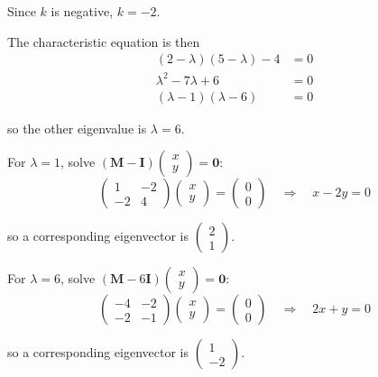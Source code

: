 \documentclass[leqno]{article}
\begin{document}
\begin{enumerate}[
  label=\textbf{\arabic*.},
  leftmargin=*,
  topsep=0pt,
  partopsep=0pt,
  parsep=0pt
]
\begin{djsSolution}
\begin{enumerate}[label=\textbf{(\alph*)}, start=1]
Since \(k\) is negative, \(k=-2\).

The characteristic equation is then
\begin{align*}
(2-\lambda)(5-\lambda)-4&=0\\
\lambda^2-7\lambda+6&=0\\
(\lambda-1)(\lambda-6)&=0
\end{align*}

so the other eigenvalue is \(\lambda=6\).

For \(\lambda=1\), solve \((\mathbf{M}-\mathbf{I})\begin{pmatrix}x\\y\end{pmatrix}=\mathbf{0}\):
\[
\begin{pmatrix} 1 & -2 \\ -2 & 4 \end{pmatrix}\begin{pmatrix}x\\y\end{pmatrix}=\begin{pmatrix}0\\0\end{pmatrix}\quad\Longrightarrow\quad x-2y=0
\]

so a corresponding eigenvector is \(\begin{pmatrix}2\\1\end{pmatrix}\).

For \(\lambda=6\), solve \((\mathbf{M}-6\mathbf{I})\begin{pmatrix}x\\y\end{pmatrix}=\mathbf{0}\):
\[
\begin{pmatrix} -4 & -2 \\ -2 & -1 \end{pmatrix}\begin{pmatrix}x\\y\end{pmatrix}=\begin{pmatrix}0\\0\end{pmatrix}\quad\Longrightarrow\quad 2x+y=0
\]

so a corresponding eigenvector is \(\begin{pmatrix}1\\-2\end{pmatrix}\).


\end{enumerate}
\end{djsSolution}
\end{enumerate}
\end{document}
